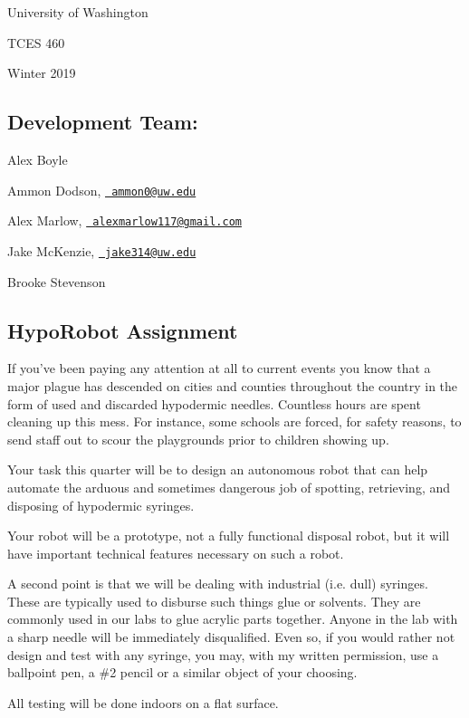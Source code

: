 University of Washington

T\+C\+ES 460

Winter 2019\hypertarget{index_autotoc_md1}{}\subsection{Development Team\+:}\label{index_autotoc_md1}

\begin{DoxyItemize}
\item Alex Boyle
\item Ammon Dodson, \href{mailto:ammon0@uw.edu}{\texttt{ ammon0@uw.\+edu}}
\item Alex Marlow, \href{mailto:alexmarlow117@gmail.com}{\texttt{ alexmarlow117@gmail.\+com}}
\item Jake Mc\+Kenzie, \href{mailto:jake314@uw.edu}{\texttt{ jake314@uw.\+edu}}
\item Brooke Stevenson
\end{DoxyItemize}\hypertarget{index_autotoc_md2}{}\subsection{Hypo\+Robot Assignment}\label{index_autotoc_md2}
If you’ve been paying any attention at all to current events you know that a major plague has descended on cities and counties throughout the country in the form of used and discarded hypodermic needles. Countless hours are spent cleaning up this mess. For instance, some schools are forced, for safety reasons, to send staff out to scour the playgrounds prior to children showing up.

Your task this quarter will be to design an autonomous robot that can help automate the arduous and sometimes dangerous job of spotting, retrieving, and disposing of hypodermic syringes.

Your robot will be a prototype, not a fully functional disposal robot, but it will have important technical features necessary on such a robot.

A second point is that we will be dealing with industrial (i.\+e. dull) syringes. These are typically used to disburse such things glue or solvents. They are commonly used in our labs to glue acrylic parts together. Anyone in the lab with a sharp needle will be immediately disqualified. Even so, if you would rather not design and test with any syringe, you may, with my written permission, use a ballpoint pen, a \#2 pencil or a similar object of your choosing.

All testing will be done indoors on a flat surface. 